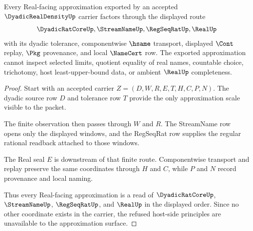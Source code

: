 \begin{theorem}
\label{thm:dyadic-real-density-real-approximation}
Every Real-facing approximation exported by an accepted $\DyadicRealDensityUp$ carrier factors through the displayed route
$$
\DyadicRatCoreUp,\StreamNameUp,\RegSeqRatUp,\RealUp
$$
with its dyadic tolerance, componentwise $\hsame$ transport, displayed $\Cont$ replay, $\Pkg$ provenance, and local $\NameCert$ row. The exported approximation cannot inspect selected limits, quotient equality of real names, countable choice, trichotomy, host least-upper-bound data, or ambient $\RealUp$ completeness.
\end{theorem}
\begin{proof}
Start with an accepted carrier $Z=(D,W,R,E,T,H,C,P,N)$. The dyadic source row $D$ and tolerance row $T$ provide the only approximation scale visible to the packet.

The finite observation then passes through $W$ and $R$. The StreamName row opens only the displayed windows, and the RegSeqRat row supplies the regular rational readback attached to those windows.

The Real seal $E$ is downstream of that finite route. Componentwise transport and replay preserve the same coordinates through $H$ and $C$, while $P$ and $N$ record provenance and local naming.

Thus every Real-facing approximation is a read of $\DyadicRatCoreUp$, $\StreamNameUp$, $\RegSeqRatUp$, and $\RealUp$ in the displayed order. Since no other coordinate exists in the carrier, the refused host-side principles are unavailable to the approximation surface.
\end{proof}


\begin{closurestatus}{\DyadicRealDensityUp}
  \theoryclosure{\seedClosure}
  \formalstatus{\unformalizedV}
\end{closurestatus}
